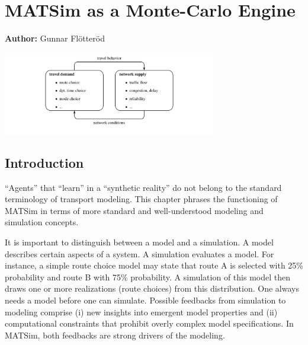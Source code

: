\chapter{MATSim as a Monte-Carlo Engine}
\label{ch:montecarlo}

\hfill \textbf{Author:} Gunnar Flötteröd

\begin{center} \includegraphics[width=0.7\textwidth, angle=0]{understanding/figures/mc/fig0.pdf} \end{center}


\makeatletter

\providecommand{\tabularnewline}{\\}
\providecommand{\algorithmname}{Algorithm}
\floatname{algorithm}{\protect\algorithmname}

\makeatother

\section{Introduction}

{}``Agents'' that {}``learn'' in a {}``synthetic reality'' do
not belong to the standard terminology of transport modeling. This
chapter phrases the functioning of MATSim in terms of more standard
and well-understood modeling and simulation concepts.

It is important to distinguish between a \gls{model} and a \gls{simulation}. A
model describes certain aspects of a \gls{system}. A simulation evaluates
a model. For instance, a simple route choice model may state that
route A is selected with 25\% probability and route B with 75\% probability.
A simulation of this model then draws one or more realizations (route
choices) from this distribution. One always needs a model before one
can simulate. Possible feedbacks from simulation to modeling comprise
(i) new insights into emergent model properties and (ii) computational
constraints that prohibit overly complex model specifications. In
MATSim, both feedbacks are strong drivers of the modeling. 


